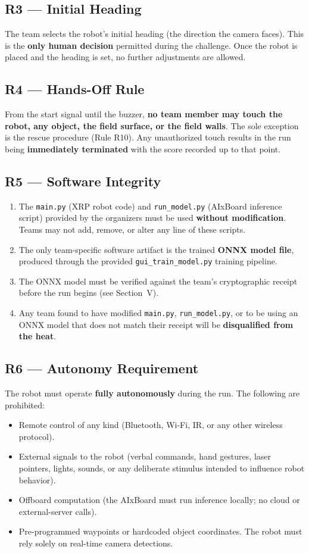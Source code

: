 \documentclass[a4]{article}
\begin{document}
\subsection*{R3 --- Initial Heading}
The team selects the robot's initial heading (the direction the camera faces). This is the \textbf{only human decision} permitted during the challenge. Once the robot is placed and the heading is set, no further adjustments are allowed.

\subsection*{R4 --- Hands-Off Rule}
From the start signal until the buzzer, \textbf{no team member may touch the robot, any object, the field surface, or the field walls}. The sole exception is the rescue procedure (Rule R10). Any unauthorized touch results in the run being \textbf{immediately terminated} with the score recorded up to that point.

\subsection*{R5 --- Software Integrity}
\begin{enumerate}[label=\alph*)]
    \item The \texttt{main.py} (XRP robot code) and \texttt{run\_model.py} (AIxBoard inference script) provided by the organizers must be used \textbf{without modification}. Teams may not add, remove, or alter any line of these scripts.
    \item The only team-specific software artifact is the trained \textbf{ONNX model file}, produced through the provided \texttt{gui\_train\_model.py} training pipeline.
    \item The ONNX model must be verified against the team's cryptographic receipt before the run begins (see Section~V).
    \item Any team found to have modified \texttt{main.py}, \texttt{run\_model.py}, or to be using an ONNX model that does not match their receipt will be \textbf{disqualified from the heat}.
\end{enumerate}

\subsection*{R6 --- Autonomy Requirement}
The robot must operate \textbf{fully autonomously} during the run. The following are prohibited:
\begin{itemize}
    \item Remote control of any kind (Bluetooth, Wi-Fi, IR, or any other wireless protocol).
    \item External signals to the robot (verbal commands, hand gestures, laser pointers, lights, sounds, or any deliberate stimulus intended to influence robot behavior).
    \item Offboard computation (the AIxBoard must run inference locally; no cloud or external-server calls).
    \item Pre-programmed waypoints or hardcoded object coordinates. The robot must rely solely on real-time camera detections.
\end{itemize}
\end{document}
